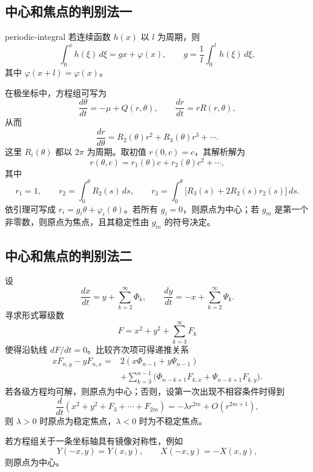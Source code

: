 \subsection*{中心和焦点的判别法一}

\begin{lemma}{}{periodic-integral}
若连续函数 $h(x)$ 以 $l$ 为周期，则
\[
\int_0^x h(\xi)\,d\xi=gx+\varphi(x),\qquad
g=\dfrac1l\int_0^l h(\xi)\,d\xi,
\]
其中 $\varphi(x+l)=\varphi(x)$。
\end{lemma}

在极坐标中，方程组可写为
\[
\dfrac{d\theta}{dt}=-\mu+Q(r,\theta),\qquad
\dfrac{dr}{dt}=rR(r,\theta),
\tag{5.5}
\]
从而
\[
\dfrac{dr}{d\theta}
 =R_2(\theta)r^2+R_3(\theta)r^3+\cdots .
\tag{5.6}
\]
这里 $R_i(\theta)$ 都以 $2\pi$ 为周期。取初值 $r(0,c)=c$，其解析解为
\[
r(\theta,c)=r_1(\theta)c+r_2(\theta)c^2+\cdots ,
\tag{5.8}
\]
其中
\[
r_1=1,\qquad r_2=\int_0^\theta R_2(s)\,ds,\qquad
r_3=\int_0^\theta\bigl[R_3(s)+2R_2(s)r_2(s)\bigr]\,ds .
\]
依引理可写成 $r_i=g_i\theta+\varphi_i(\theta)$。若所有 $g_i=0$，则原点为中心；若 $g_m$ 是第一个非零数，则原点为焦点，且其稳定性由 $g_m$ 的符号决定。

\subsection*{中心和焦点的判别法二}

设
\[
\dfrac{dx}{dt}=y+\sum_{k=2}^{\infty}\Phi_k,\qquad
\dfrac{dy}{dt}=-x+\sum_{k=2}^{\infty}\Psi_k.
\tag{5.16}
\]
寻求形式幂级数
\[
F=x^2+y^2+\sum_{k=3}^{\infty}F_k
\]
使得沿轨线 $dF/dt=0$。比较齐次项可得递推关系
\[
\begin{aligned}
xF_{n,y}-yF_{n,x}
={}&2(x\Phi_{n-1}+y\Psi_{n-1})\\
&+\sum_{k=3}^{n-1}
 \bigl(\Phi_{n-k+1}F_{k,x}+\Psi_{n-k+1}F_{k,y}\bigr).
\end{aligned}
\tag{5.18}
\]
若各级方程均可解，则原点为中心；否则，设第一次出现不相容条件时得到
\[
\dfrac{d}{dt}(x^2+y^2+F_3+\cdots+F_{2m})
 =-\lambda r^{2m}+O(r^{2m+1}),
\tag{5.26}
\]
则 $\lambda>0$ 时原点为稳定焦点，$\lambda<0$ 时为不稳定焦点。

若方程组关于一条坐标轴具有镜像对称性，例如
\[
Y(-x,y)=Y(x,y),\qquad X(-x,y)=-X(x,y),
\]
则原点为中心。

